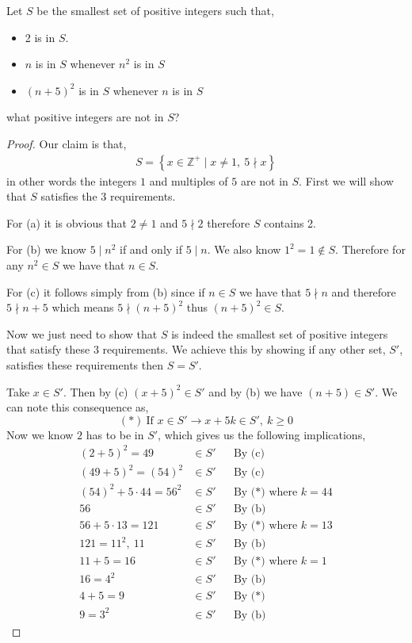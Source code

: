 \documentclass[11pt]{article}
\newenvironment{problem}[2][Problem\!]{\begin{trivlist}
\item[\hskip \labelsep {\bfseries #1}\hskip \labelsep {\bfseries #2}]}{\end{trivlist}}
\newcommand{\zz}{\mathbb Z}   %
\newcommand{\set}[1]{\left\{#1\right\}} %
\renewcommand{\geq}{\geqslant}
\begin{document}
\begin{tcolorbox}
    \begin{problem} {OC | 11/22 | PP 20.}
        Let $S$ be the smallest set of positive integers such that,
        \begin{itemize}
            \item[(a)] 2 is in $S$.
            \item[(b)] $n$ is in $S$ whenever $n^2$ is in $S$
            \item[(c)] $(n+5)^{2}$ is in $S$ whenever $n$ is in $S$  
        \end{itemize}
        what positive integers are not in $S$?
    \end{problem}
\end{tcolorbox}
\begin{proof}
    Our claim is that,
    \begin{align*}
        S = \set{x \in \zz^{+} \mid x \neq 1,\ 5 \nmid x}
    \end{align*}
    in other words the integers $1$ and multiples of $5$ are not in $S$. First we will show that $S$ satisfies the 3 requirements. 

    For (a) it is obvious that $2 \neq 1$ and $5 \nmid 2$ therefore $S$ contains 2. 

    For (b) we know $5 \mid n^{2}$ if and only if $5 \mid n$. We also know $1^{2} = 1 \notin S$. Therefore for any $n^{2} \in S$ we have that $n \in S$.

    For (c) it follows simply from (b) since if $n \in S$ we have that $5\nmid n $ and therefore $5\nmid n+5$ which means $5 \nmid (n+5)^{2}$ thus $(n+5)^{2} \in S$.

    Now we just need to show that $S$ is indeed the smallest set of positive integers that satisfy these 3 requirements. We achieve this by showing if any other set, $S'$, satisfies these requirements then $S = S'$.

    Take $x \in S'$. Then by (c) $(x + 5)^{2} \in S'$ and by (b) we have $(n +5) \in S'$. We can note this consequence as, \[(*)\ \text{If }x \in S'  \rightarrow x+5k \in S', \ k \geq 0\] Now we know $2$ has to be in $S'$, which gives us the following implications,
    \begin{align}
        (2 + 5)^{2} = 49 &\in S' && \text{By (c)} \\
        (49 + 5)^{2} = (54)^{2} &\in S' && \text{By (c)} \\
        (54)^{2} + 5\cdot 44 = 56^{2} &\in S' && \text{By (*) where $k = 44$} \\
        56 &\in S' && \text{By (b)} \\
         56 + 5\cdot 13 = 121 &\in S' && \text{By (*) where $k = 13$} \\
         121 = 11^{2}, \ 11 &\in S' && \text{By (b)} \\
         11 + 5 = 16 &\in S' && \text{By (*) where $k = 1$} \\
         16 = 4^{2}&\in S' && \text{By (b)} \\
         4 + 5 = 9 &\in S' && \text{By (*)} \\
         9 = 3^{2} &\in S' && \text{By (b)}  
    \end{align}


\end{proof}
\end{document}
